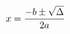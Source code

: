 \documentclass[preview]{standalone}
\begin{document}
\begin{align*}
x = {-b \pm \sqrt{ \Delta } \over 2a}
\end{align*}
\end{document}
